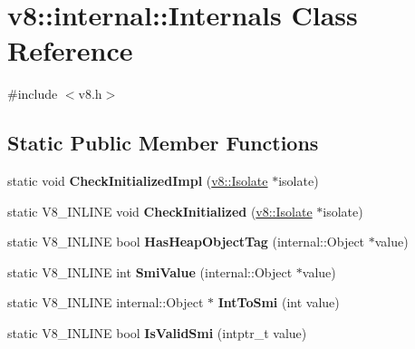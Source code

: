 \hypertarget{classv8_1_1internal_1_1_internals}{}\section{v8\+:\+:internal\+:\+:Internals Class Reference}
\label{classv8_1_1internal_1_1_internals}


{\ttfamily \#include $<$v8.\+h$>$}

\subsection*{Static Public Member Functions}
\begin{DoxyCompactItemize}
\item 
\hypertarget{classv8_1_1internal_1_1_internals_a7ab121afc5229c0cced6fa96f020251c}{}static void {\bfseries Check\+Initialized\+Impl} (\hyperlink{classv8_1_1_isolate}{v8\+::\+Isolate} $\ast$isolate)\label{classv8_1_1internal_1_1_internals_a7ab121afc5229c0cced6fa96f020251c}

\item 
\hypertarget{classv8_1_1internal_1_1_internals_a1aa4bc86bc011f055fe27d18e0849b8c}{}static V8\+\_\+\+I\+N\+L\+I\+N\+E void {\bfseries Check\+Initialized} (\hyperlink{classv8_1_1_isolate}{v8\+::\+Isolate} $\ast$isolate)\label{classv8_1_1internal_1_1_internals_a1aa4bc86bc011f055fe27d18e0849b8c}

\item 
\hypertarget{classv8_1_1internal_1_1_internals_a0d611390ea5dde42847fe8237e4ced9d}{}static V8\+\_\+\+I\+N\+L\+I\+N\+E bool {\bfseries Has\+Heap\+Object\+Tag} (internal\+::\+Object $\ast$value)\label{classv8_1_1internal_1_1_internals_a0d611390ea5dde42847fe8237e4ced9d}

\item 
\hypertarget{classv8_1_1internal_1_1_internals_acdd6e8e3d151402cfa9eea84e3023a78}{}static V8\+\_\+\+I\+N\+L\+I\+N\+E int {\bfseries Smi\+Value} (internal\+::\+Object $\ast$value)\label{classv8_1_1internal_1_1_internals_acdd6e8e3d151402cfa9eea84e3023a78}

\item 
\hypertarget{classv8_1_1internal_1_1_internals_a9e5ab52581c9c32ac018fb1cc98ab5fa}{}static V8\+\_\+\+I\+N\+L\+I\+N\+E internal\+::\+Object $\ast$ {\bfseries Int\+To\+Smi} (int value)\label{classv8_1_1internal_1_1_internals_a9e5ab52581c9c32ac018fb1cc98ab5fa}

\item 
\hypertarget{classv8_1_1internal_1_1_internals_a69b0abda8cf242042f4f19bcba35fd18}{}static V8\+\_\+\+I\+N\+L\+I\+N\+E bool {\bfseries Is\+Valid\+Smi} (intptr\+\_\+t value)\label{classv8_1_1internal_1_1_internals_a69b0abda8cf242042f4f19bcba35fd18}


\end{DoxyCompactItemize}
